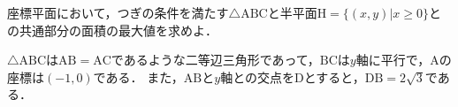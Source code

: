 \documentclass[../../main.tex]{subfiles}
\begin{document}
座標平面において，つぎの条件を満たす$\triangle \mathrm{ABC}$と半平面$\mathrm{H}=\{(x,y)|x\ge 0\}$との共通部分の面積の最大値を求めよ．

$\triangle \mathrm{ABC}$は$\mathrm{AB}=\mathrm{AC}$であるような二等辺三角形であって，$\mathrm{BC}$は$y$軸に平行で，$\mathrm{A}$の座標は$(-1,0)$である．
また，$\mathrm{AB}$と$y$軸との交点を$\mathrm{D}$とすると，$\mathrm{DB}=2\sqrt{3}$である．
\end{document}
